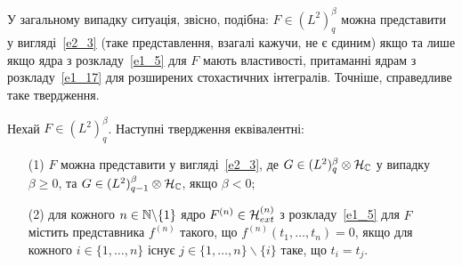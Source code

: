 У загальному випадку ситуація, звісно, подібна: $F\in (L^2)^\beta_q$ можна представити у
вигляді~\eqref{e2_3} (таке представлення, взагалі кажучи, не є єдиним) якщо та лише якщо ядра
з розкладу~\eqref{e1_5} для $F$ мають властивості, притаманні ядрам з розкладу~\eqref{e1_17} для
розширених стохастичних інтегралів. Точніше, справедливе таке твердження.
\begin{subtheorem}\label{t2_2_1}
Нехай $F\in (L^2)^\beta_q$. Наступні твердження еквівалентні:
\begin{itemize}
\item[(1)] $F$ можна представити у вигляді~\eqref{e2_3}, де
$G\in (L^2)^\beta_q\otimes\mathcal{H}_{\mathbb{C}}$ у випадку $\beta\geq 0$, та
$G\in (L^2)^\beta_{q-1}\otimes\mathcal{H}_{\mathbb{C}}$, якщо $\beta<0$;
\item[(2)] для кожного $n\in\mathbb{N}\backslash\{1\}$ ядро
$F^{(n)}\in\mathcal{H}_{ext}^{(n)}$ з розкладу~\eqref{e1_5} для $F$ містить представника
$f^{(n)}$ такого, що $f^{(n)}(t_1,\dots,t_n)=0$, якщо для кожного $i\in\{1,\dots,n\}$
існує $j\in\{1,\dots,n\}\backslash\{i\}$ таке, що $t_i=t_j$.
\end{itemize}
\end{subtheorem}
